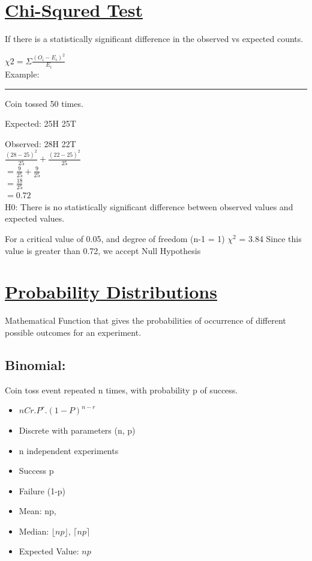 \documentclass[11pt]{article}
\begin{document}
\section{\underline{Chi-Squred Test}}
\label{sec:org6c3d696}

If there is a statistically significant difference in the observed vs expected counts.

\(\chi{2} = \Sigma\frac{(O_{i} - E_{i})^2}{E_{i}}\) \\


Example:

\noindent\rule{\textwidth}{0.5pt}
Coin tossed 50 times.

Expected: 25H 25T

Observed: 28H 22T \\


\(\frac{(28-25)^2}{25} +   \frac{(22-25)^2}{25}\) \\

\(= \frac{9}{25} + \frac{9}{25}\) \\

\(= \frac{18}{25}\) \\

\(= 0.72\) \\

H0: There is no statistically significant difference between observed values and expected values.

For a critical value of 0.05, and degree of freedom (n-1 = 1)   \(\chi^{2}\) = 3.84
Since this value is greater than 0.72, we accept Null Hypothesis


\section{\underline{Probability Distributions}}
\label{sec:orga336487}

Mathematical Function that gives the probabilities of occurrence of different
possible outcomes for an experiment. \\

\subsection{Binomial:}
\label{sec:org0274547}

Coin toss event repeated n times, with probability p of success. 

\begin{itemize}
\item \(nCr . P^{r} . (1 - P)^{n-r}\)
\item Discrete with parameters (n, p)
\item n independent experiments
\item Success p
\item Failure (1-p)
\item Mean: np,
\item Median: \(\lfloor np \rfloor\), \(\lceil np \rceil\)
\item Expected Value: \(np\)
\end{itemize}
\end{document}

